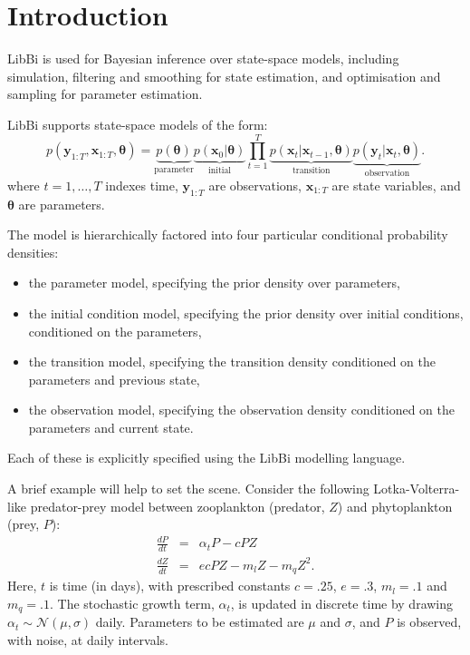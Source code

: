 \section{Introduction\label{Introduction}}

LibBi is used for Bayesian inference over state-space models, including
simulation, filtering and smoothing for state estimation, and optimisation and
sampling for parameter estimation.

LibBi supports state-space models of the form:
\begin{equation*}
p(\mathbf{y}_{1:T},\mathbf{x}_{1:T},\boldsymbol{\theta}) =
\underbrace{p(\boldsymbol{\theta})}_{\text{parameter}}
\underbrace{p(\mathbf{x}_0|\boldsymbol{\theta})}_{\text{initial}}
\prod_{t=1}^T
\underbrace{p(\mathbf{x}_t|\mathbf{x}_{t-1},\boldsymbol{\theta})}_{\text{transition}}
\underbrace{p(\mathbf{y}_t|\mathbf{x}_t,\boldsymbol{\theta})}_{\text{observation}}.
\end{equation*}
where $t = 1,\ldots,T$ indexes time, $\mathbf{y}_{1:T}$ are observations,
$\mathbf{x}_{1:T}$ are state variables, and $\boldsymbol{\theta}$ are
parameters.

The model is hierarchically factored into four particular conditional
probability densities:
\begin{itemize}
\item the parameter model, specifying the prior density over parameters,
\item the initial condition model, specifying the prior density over initial
  conditions, conditioned on the parameters,
\item the transition model, specifying the transition density conditioned on
  the parameters and previous state,
\item the observation model, specifying the observation density conditioned on
  the parameters and current state.
\end{itemize}
Each of these is explicitly specified using the LibBi modelling
language.

A brief example will help to set the scene. Consider the following
Lotka-Volterra-like predator-prey model between zooplankton (predator, $Z$)
and phytoplankton (prey, $P$):
\begin{eqnarray*}
\frac{dP}{dt} &=& \alpha_t P - cPZ\\
\frac{dZ}{dt} &=& ecPZ - m_lZ - m_q Z^2.
\end{eqnarray*}
Here, $t$ is time (in days), with prescribed constants $c = .25$, $e = .3$,
$m_l = .1$ and $m_q = .1$. The stochastic growth term, $\alpha_t$, is updated
in discrete time by drawing $\alpha_t \sim \mathcal{N}(\mu,\sigma)$
daily. Parameters to be estimated are $\mu$ and $\sigma$, and $P$ is observed,
with noise, at daily intervals.

